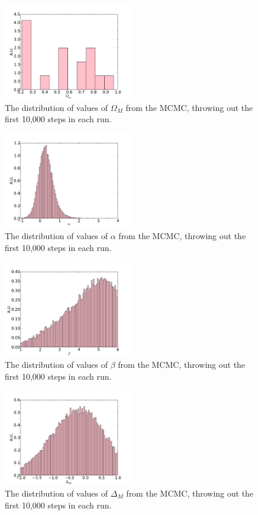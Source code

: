 \documentclass[aps,prl,reprint]{revtex4-1}
\begin{document}
\begin{figure}
 \includegraphics[width=0.5\textwidth]{../plots/om_hist.pdf}
\caption{\label{fig:omhist}The distribution of values of $\Omega_M$ from the MCMC, throwing out the first 10,000 steps in each run.}
\end{figure}
\begin{figure}
 \includegraphics[width=0.5\textwidth]{../plots/alpha_hist.pdf}
\caption{\label{fig:alphahist}The distribution of values of $\alpha$ from the MCMC, throwing out the first 10,000 steps in each run.}
\end{figure}
\begin{figure}
 \includegraphics[width=0.5\textwidth]{../plots/beta_hist.pdf}
\caption{\label{fig:betahist}The distribution of values of $\beta$ from the MCMC, throwing out the first 10,000 steps in each run.}
\end{figure}
\begin{figure}
 \includegraphics[width=0.5\textwidth]{../plots/dM_hist.pdf}
\caption{\label{fig:dMhist}The distribution of values of $\Delta_M$ from the MCMC, throwing out the first 10,000 steps in each run.}
\end{figure}
\end{document}
